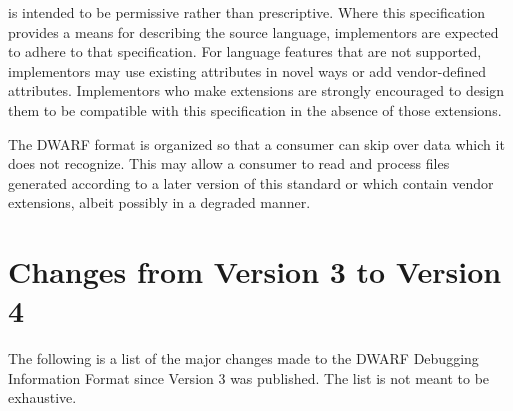 is intended to be permissive rather than
prescriptive. 
Where this specification provides a means for
describing the source language, implementors are expected
to adhere to that specification. 
For language features that
are not supported, implementors may use existing attributes
in novel ways or add vendor-defined attributes. 
Implementors
who make extensions are strongly encouraged to design them
to be compatible with this specification in the absence of
those extensions.

The DWARF format is organized so that a consumer can skip over
data which it does not recognize. 
This may allow a consumer
to read and process files generated according to a later
version of this standard or which contain vendor extensions,
albeit possibly in a degraded manner.


\section{Changes from Version 3 to Version 4}
The following is a list of the major changes made to the DWARF Debugging Information
Format since Version 3 was published. The list is not meant to be exhaustive.


